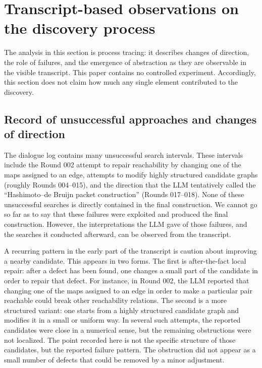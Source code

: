 \documentclass[11pt]{article}
\theoremstyle{definition}
\theoremstyle{remark}
\renewcommand{\_}{\textunderscore\allowbreak}
\begin{document}
\section{Transcript-based observations on the discovery
process}\label{transcript-based-observations-on-the-discovery-process}

The analysis in this section is process tracing: it describes changes of
direction, the role of failures, and the emergence of abstraction as
they are observable in the visible transcript. This paper contains no
controlled experiment. Accordingly, this section does not claim how much
any single element contributed to the discovery.

\subsection{Record of unsuccessful approaches and changes of
direction}\label{record-of-unsuccessful-approaches-and-changes-of-direction}

The dialogue log contains many unsuccessful search intervals. These
intervals include the Round 002 attempt to repair reachability by
changing one of the maps assigned to an edge, attempts to modify highly
structured candidate graphs (roughly Rounds 004--015), and the direction
that the LLM tentatively called the ``Hashimoto--de Bruijn packet
construction'' (Rounds 017--018). None of these unsuccessful searches is
directly contained in the final construction. We cannot go so far as to
say that these failures were exploited and produced the final
construction. However, the interpretations the LLM gave of those
failures, and the searches it conducted afterward, can be observed from
the transcript.

A recurring pattern in the early part of the transcript is caution about
improving a nearby candidate. This appears in two forms. The first is
after-the-fact local repair: after a defect has been found, one changes
a small part of the candidate in order to repair that defect. For
instance, in Round 002, the LLM reported that changing one of the maps
assigned to an edge in order to make a particular pair reachable could
break other reachability relations. The second is a more structured
variant: one starts from a highly structured candidate graph and
modifies it in a small or uniform way. In several such attempts, the
reported candidates were close in a numerical sense, but the remaining
obstructions were not localized. The point recorded here is not the
specific structure of those candidates, but the reported failure
pattern. The obstruction did not appear as a small number of defects
that could be removed by a minor adjustment.
\end{document}

